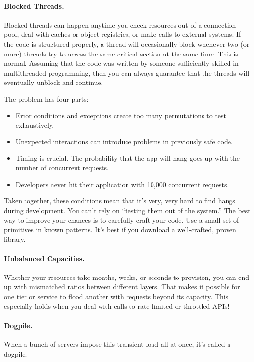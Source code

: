 \paragraph{Blocked Threads.} Blocked threads can happen anytime you check resources out of a connection pool, deal with caches or object registries, or make calls to external systems. If the code is structured properly, a thread will occasionally block whenever two (or more) threads try to access the same critical section at the same time. This is normal. Assuming that the code was written by someone sufficiently skilled in multithreaded programming, then you can always guarantee that the threads will eventually unblock and continue.

The problem has four parts:

\begin{itemize}

\item Error conditions and exceptions create too many permutations to test exhaustively.
\item Unexpected interactions can introduce problems in previously safe code.
\item Timing is crucial. The probability that the app will hang goes up with the number of concurrent requests.
\item Developers never hit their application with 10,000 concurrent requests.

\end{itemize}
  
Taken together, these conditions mean that it’s very, very hard to find hangs during development. You can’t rely on “testing them out of the system.” The best way to improve your chances is to carefully craft your code. Use a small set of primitives in known patterns. It’s best if you download a well-crafted, proven library.

\paragraph{Unbalanced Capacities.} Whether your resources take months, weeks, or seconds to provision, you can end up with mismatched ratios between different layers. That makes it possible for one tier or service to flood another with requests beyond its capacity. This especially holds when you deal with calls to rate-limited or throttled APIs!

\paragraph{Dogpile.} When a bunch of servers impose this transient load all at once, it’s called a dogpile.

